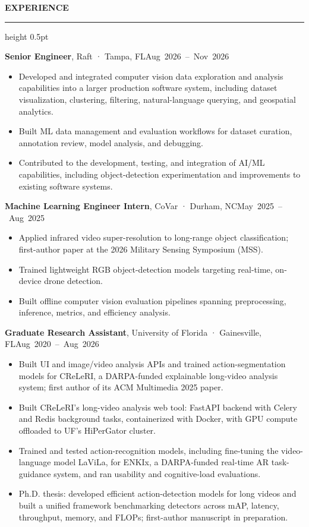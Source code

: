 \documentclass[10pt,letterpaper]{article}
\newcommand{\ressection}[1]{\par\addvspace{9pt}\textbf{\MakeUppercase{#1}}\par\nobreak\vspace{1.5pt}\hrule height 0.5pt\nobreak\vspace{4.5pt}}
\newcommand{\resrow}[2]{\noindent #1\hfill\mbox{#2}\par}
\newcommand{\resrole}[3]{\par\addvspace{5pt}\resrow{\textbf{#1}, #2}{#3}}
\begin{document}
\ressection{Experience}
\resrole{Senior Engineer}{Raft · Tampa, FL}{Aug 2026 – Nov 2026}
\begin{itemize}
\item Developed and integrated computer vision data exploration and analysis capabilities into a larger production software system, including dataset visualization, clustering, filtering, natural-language querying, and geospatial analytics.
\item Built ML data management and evaluation workflows for dataset curation, annotation review, model analysis, and debugging.
\item Contributed to the development, testing, and integration of AI/ML capabilities, including object-detection experimentation and improvements to existing software systems.
\end{itemize}
\resrole{Machine Learning Engineer Intern}{CoVar · Durham, NC}{May 2025 – Aug 2025}
\begin{itemize}
\item Applied infrared video super-resolution to long-range object classification; first-author paper at the 2026 Military Sensing Symposium (MSS).
\item Trained lightweight RGB object-detection models targeting real-time, on-device drone detection.
\item Built offline computer vision evaluation pipelines spanning preprocessing, inference, metrics, and efficiency analysis.
\end{itemize}
\resrole{Graduate Research Assistant}{University of Florida · Gainesville, FL}{Aug 2020 – Aug 2026}
\begin{itemize}
\item Built UI and image/video analysis APIs and trained action-segmentation models for CReLeRI, a DARPA-funded explainable long-video analysis system; first author of its ACM Multimedia 2025 paper.
\item Built CReLeRI's long-video analysis web tool: FastAPI backend with Celery and Redis background tasks, containerized with Docker, with GPU compute offloaded to UF's HiPerGator cluster.
\item Trained and tested action-recognition models, including fine-tuning the video-language model LaViLa, for ENKIx, a DARPA-funded real-time AR task-guidance system, and ran usability and cognitive-load evaluations.
\item Ph.D. thesis: developed efficient action-detection models for long videos and built a unified framework benchmarking detectors across mAP, latency, throughput, memory, and FLOPs; first-author manuscript in preparation.
\end{itemize}
\end{document}
